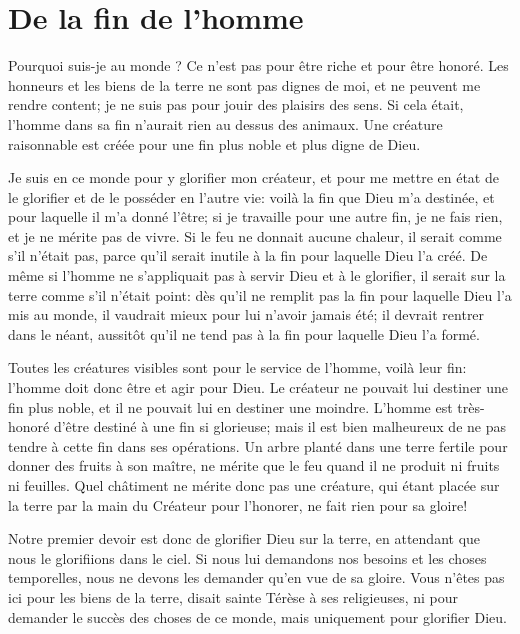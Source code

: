 \documentclass[instructions.tex]{subfiles}
\begin{document}
 
\chapter{De la fin de l'homme}
 
\primo Pourquoi suis-je au monde ? Ce n'est pas pour être riche et pour être honoré. Les honneurs et les biens de la terre ne sont pas dignes de moi, et ne peuvent me rendre content; je ne suis pas pour jouir des plaisirs des sens. Si cela était, l'homme dans sa fin n'aurait rien au dessus des animaux. Une créature raisonnable est créée pour une fin plus noble et plus digne de Dieu.

Je suis en ce monde pour y glorifier mon créateur, et pour me mettre en état de le glorifier et de le posséder en l'autre vie: voilà la fin que Dieu m'a destinée, et pour laquelle il m'a donné l'être; si je travaille pour une autre fin, je ne fais rien, et je ne mérite pas de vivre. Si le feu ne donnait aucune chaleur, il serait comme s'il n'était pas, parce qu'il serait inutile à la fin pour laquelle Dieu l'a créé. De même si l'homme ne s'appliquait pas à servir Dieu et à le glorifier, il serait sur la terre comme s'il n'était point: dès qu'il ne remplit pas la fin pour laquelle Dieu l'a mis au monde, il vaudrait mieux pour lui n'avoir jamais été; il devrait rentrer dans le néant, aussitôt qu'il ne tend pas à la fin pour laquelle Dieu l'a formé. 

Toutes les créatures visibles sont pour le service de l'homme, voilà leur fin: l'homme doit donc être et agir pour Dieu. Le créateur ne pouvait lui destiner une fin plus noble, et il ne pouvait lui en destiner une moindre. L'homme est très-honoré d'être destiné à une fin si glorieuse; mais il est bien malheureux de ne pas tendre à cette fin dans ses opérations. Un arbre planté dans une terre fertile pour donner des fruits à son maître, ne mérite que le feu quand il ne produit ni fruits ni feuilles. Quel châtiment ne mérite donc pas une créature, qui étant placée sur la terre par la main du Créateur pour l'honorer, ne fait rien pour sa gloire! 

\secundo Notre premier devoir est donc de glorifier Dieu sur la terre, en attendant que nous le glorifiions dans le ciel. Si nous lui demandons nos besoins et les choses temporelles, nous ne devons les demander qu'en vue de sa gloire. \og Vous n'êtes pas ici pour les biens de la terre\fg, disait sainte Térèse à ses religieuses, \og ni pour demander le succès des choses de ce monde, mais uniquement pour glorifier Dieu\fg. 
\end{document}
